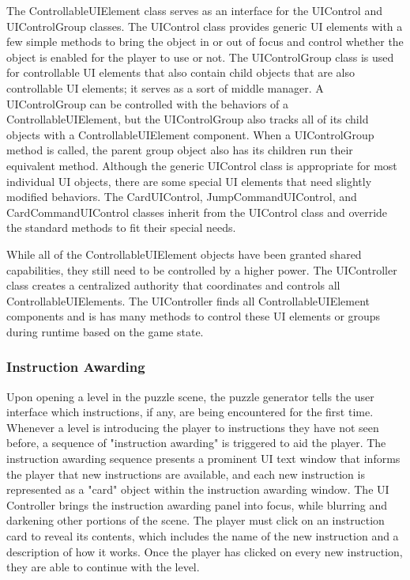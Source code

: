 The ControllableUIElement class serves as an interface for the UIControl and UIControlGroup classes.
The UIControl class provides generic UI elements with a few simple methods to bring the object in or out of focus and control whether the object is enabled for the player to use or not.
The UIControlGroup class is used for controllable UI elements that also contain child objects that are also controllable UI elements; it serves as a sort of middle manager. A UIControlGroup can be controlled with the behaviors of a ControllableUIElement, but the UIControlGroup also tracks all of its child objects with a ControllableUIElement component. When a UIControlGroup method is called, the parent group object also has its children run their equivalent method.
Although the generic UIControl class is appropriate for most individual UI objects, there are some special UI elements that need slightly modified behaviors. The CardUIControl, JumpCommandUIControl, and CardCommandUIControl classes inherit from the UIControl class and override the standard methods to fit their special needs.

While all of the ControllableUIElement objects have been granted shared capabilities, they still need to be controlled by a higher power.
The UIController class creates a centralized authority that coordinates and controls all ControllableUIElements.
The UIController finds all ControllableUIElement components and is has many methods to control these UI elements or groups during runtime based on the game state.







\subsubsection{Instruction Awarding}
Upon opening a level in the puzzle scene, the puzzle generator tells the user interface which instructions, if any, are being encountered for the first time. Whenever a level is introducing the player to instructions they have not seen before, a sequence of "instruction awarding" is triggered to aid the player. The instruction awarding sequence presents a prominent UI text window that informs the player that new instructions are available, and each new instruction is represented as a "card" object within the instruction awarding window.
The UI Controller brings the instruction awarding panel into focus, while blurring and darkening other portions of the scene.
The player must click on an instruction card to reveal its contents, which includes the name of the new instruction and a description of how it works. Once the player has clicked on every new instruction, they are able to continue with the level.




